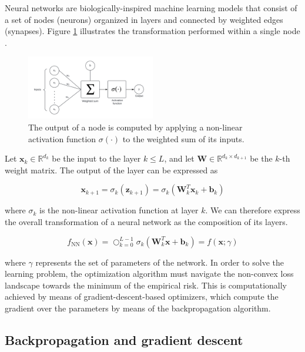 Neural networks are biologically-inspired machine learning models that consist of a set of 
nodes (neurons) organized in layers and connected by weighted edges
(synapses). Figure \ref{fig:nn_node} illustrates the transformation
performed within a single node
\cite{simonyanVeryDeepConvolutional2015,n.vapnikNatureStatisticalLearning2000,voulodimosDeepLearningComputer2018}. 

\begin{figure}[H]
    \centering
    \includegraphics[width=0.5\textwidth]{img/theoretical_background/nn_node.png}
    \caption{The output of a node is computed by applying a non-linear
    activation function $\sigma(\cdot)$ to the weighted sum of its inputs.}
    \label{fig:nn_node}
\end{figure}

Let $\bm{x}_k \in \mathbb{R}^{d_k}$ be the input to the layer $k \leq L$, and let $\bm{W} \in \mathbb{R}^{d_k \times d_{k+1}}$ be the $k$-th weight matrix. The output of the layer can be expressed as

$$
\bm{x}_{k+1} = \sigma_k(\bm{z}_{k+1}) = \sigma_k(\bm{W}_k^T \bm{x}_k + \bm{b}_k)
$$

where $\sigma_k$ is the non-linear activation function at layer $k$. We 
can therefore express the overall transformation of a neural network
as the composition of its layers.

$$
f_{\text{NN}}(\bm{x}) = \bigcirc_{k=0}^{L-1} \sigma_k(\bm{W}_k^T \bm{x} + \bm{b}_k) = f(\bm{x}; \gamma)
$$

where $\gamma$ represents the set of parameters of the network. In order to solve the learning problem, the optimization algorithm must navigate the non-convex loss
landscape towards the minimum of the empirical risk. This is computationally achieved by means of gradient-descent-based optimizers, which compute the
gradient over the parameters by means of the backpropagation algorithm.

\subsection{Backpropagation and gradient descent}

